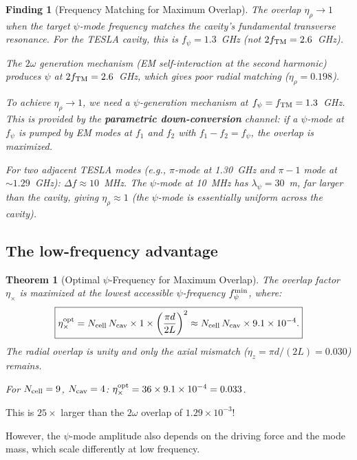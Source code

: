 \documentclass[11pt]{article}
\newtheorem{theorem}{Theorem}
\newtheorem{finding}{Finding}
\newcommand{\ee}[1]{\times 10^{#1}}
\begin{document}
\begin{finding}[Frequency Matching for Maximum Overlap]
\label{find:freq-match}
The overlap $\eta_\rho \to 1$ when the target $\psi$-mode frequency
matches the cavity's fundamental transverse resonance. For the TESLA
cavity, this is $f_\psi = 1.3$~GHz (not $2f_{\rm TM} = 2.6$~GHz).

The $2\omega$ generation mechanism (EM self-interaction at the second
harmonic) produces $\psi$ at $2f_{\rm TM} = 2.6$~GHz, which gives
poor radial matching ($\eta_\rho = 0.198$).

To achieve $\eta_\rho \to 1$, we need a $\psi$-generation mechanism
at $f_\psi = f_{\rm TM} = 1.3$~GHz. This is provided by the
\textbf{parametric down-conversion} channel: if a $\psi$-mode at
$f_\psi$ is pumped by EM modes at $f_1$ and $f_2$ with
$f_1 - f_2 = f_\psi$, the overlap is maximized.

For two adjacent TESLA modes (e.g., $\pi$-mode at 1.30~GHz and
$\pi-1$ mode at $\sim 1.29$~GHz): $\Delta f \approx 10$~MHz.
The $\psi$-mode at 10~MHz has $\lambda_\psi = 30$~m, far larger
than the cavity, giving $\eta_\rho \approx 1$ (the $\psi$-mode is
essentially uniform across the cavity).
\end{finding}

\subsection{The low-frequency advantage}

\begin{theorem}[Optimal $\psi$-Frequency for Maximum Overlap]
\label{thm:optimal-freq}
The overlap factor $\eta_\times$ is maximized at the lowest
accessible $\psi$-frequency $f_\psi^{\rm min}$, where:
\begin{equation}
\boxed{\eta_\times^{\rm opt} = N_{\rm cell}\,N_{\rm cav}
\times 1 \times \left(\frac{\pi d}{2L}\right)^2
\approx N_{\rm cell}\,N_{\rm cav} \times 9.1\ee{-4}.}
\end{equation}
The radial overlap is unity and only the axial mismatch
($\eta_z = \pi d/(2L) = 0.030$) remains.

For $N_{\rm cell} = 9$, $N_{\rm cav} = 4$:
$\eta_\times^{\rm opt} = 36 \times 9.1\ee{-4} = 0.033$.
\end{theorem}

This is $25\times$ larger than the $2\omega$ overlap of $1.29\ee{-3}$!

However, the $\psi$-mode amplitude also depends on the driving
force and the mode mass, which scale differently at low frequency.
\end{document}
